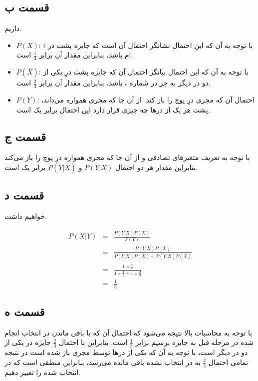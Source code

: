 \documentclass{article}
\begin{document}
\subsection*{قسمت ب}

داریم.

\begin{itemize}
    \item $P(X)$: با توجه به آن که این احتمال نشانگر احتمال آن است که جایزه پشت در $i$ام باشد، بنابراین مقدار
    آن برابر $\frac{1}{3}$ است.
    \item $P(\bar{X})$: با توجه به آن که این احتمال بیانگر احتمال آن که جایزه پشت درِ یکی از دو در دیگر به جز
    در شماره $i$ باشد، بنابراین مقدار آن برابر $\frac{2}{3}$ است.
    \item $P(Y)$: احتمال آن که مجری درِ پوچ را باز کند. از آن جا که مجری همواره می‌داند،
    پشت هر یک از در‌ها چه چیزی قرار دارد این احتمال برابر یک است.
\end{itemize}

\subsection*{قسمت ج}

با توجه به تعریف متغیر‌های تصادفی و از آن جا که مجری همواره درِ پوچ را باز می‌کند
بنابراین مقدار هر دو احتمال $P(Y|X)$ و $P(Y|\bar{X})$ برابر یک است.

\subsection*{قسمت د}

خواهیم داشت.

\begin{eqnarray*}
    P(X|Y) & = & \frac{P(Y|X) P(X)}{P(Y)} \\
    & = & \frac{P(Y|X) P(X)}{P(Y|X) P(X) + P(Y|\bar{X})P(\bar{X})} \\
    & = & \frac{1 \times \frac{1}{3}}{1 \times \frac{1}{3} + 1 \times \frac{2}{3}} \\
    & = & \frac{1}{3}
\end{eqnarray*}

\subsection*{قسمت ه}

با توجه به محاسبات بالا نتیجه می‌شود که احتمال آن که با باقی ماندن در انتخاب انجام شده در مرحله قبل
به جایزه برسیم برابر $\frac{1}{3}$ است. بنابراین با احتمال $\frac{2}{3}$ جایزه در یکی از دو در دیگر است،
با توجه به آن که یکی از در‌ها توسط مجری باز شده است در نتیجه تمامی احتمال $\frac{2}{3}$ به در انتخاب نشده
باقی مانده می‌رسد، بنابراین منطقی است که در انتخاب شده را تغییر دهیم.
\end{document}
